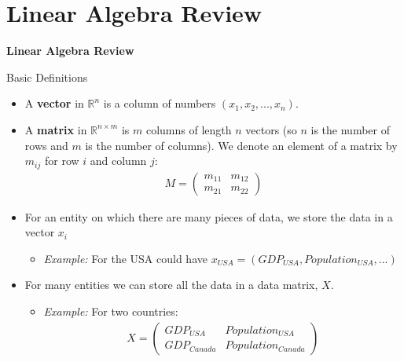 \documentclass[aspectratio=169,11pt]{beamer}
\begin{document}
\section{Linear Algebra Review}

\begin{frame}

\begin{center}
	{\Large \bf Linear Algebra Review}	
\end{center}

\end{frame}


\begin{frame}{Basic Definitions}
\begin{itemize}
	\item A {\bf vector} in $\mathbb{R}^n$ is a column of numbers $(x_1,x_2,...,x_n)$.
	\item A {\bf matrix} in $\mathbb{R}^{n\times m}$ is $m$ columns of length $n$ vectors (so $n$ is the number of rows and $m$ is the number of columns). We denote an element of a matrix by $m_{ij}$ for row $i$ and column $j$:
	\begin{align*}
		M = \left(\begin{array}{cc}
			m_{11} & m_{12}\\
			m_{21} & m_{22}
		\end{array}\right)
	\end{align*}
	\item For an entity on which there are many pieces of data, we store the data in a vector $x_i$
	\begin{itemize}
		\item[]\emph{Example:} For the USA could have $x_{USA} = \left(GDP_{USA}, Population_{USA},...\right)$
	\end{itemize}
	\item For many entities we can store all the data in a data matrix, $X$.
	\begin{itemize}
		\item[]\emph{Example:} For two countries:
			\begin{align*}
		X = \left(\begin{array}{ll}
			GDP_{USA} & Population_{USA}\\
			GDP_{Canada} & Population_{Canada}
		\end{array}\right)
			\end{align*}
	\end{itemize}
\end{itemize}

\end{frame}
\end{document}
